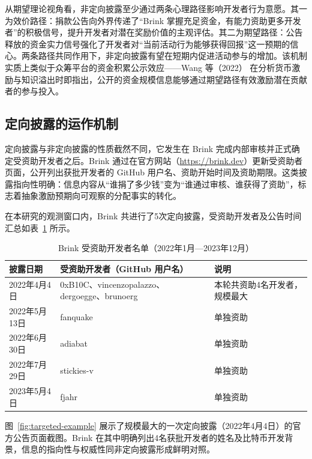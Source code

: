 从期望理论视角看，非定向披露至少通过两条心理路径影响开发者行为意愿。其一为效价路径：捐款公告向外界传递了“Brink 掌握充足资金，有能力资助更多开发者”的积极信号，提升开发者对潜在奖励价值的主观评估。其二为期望路径：公告释放的资金实力信号强化了开发者对“当前活动行为能够获得回报”这一预期的信心。两条路径共同作用下，非定向披露有望在短期内促进活动参与的增加。该机制实质上类似于众筹平台的资金积累公示效应——Wang 等（2022）\cite{wang2022monetary} 在分析货币激励与知识溢出时即指出，公开的资金规模信息能够通过期望路径有效激励潜在贡献者的参与投入。

\subsection{定向披露的运作机制}

定向披露与非定向披露的性质截然不同，它发生在 Brink 完成内部审核并正式确定受资助开发者之后。Brink 通过在官方网站（\url{https://brink.dev}）更新受资助者页面，公开列出获批开发者的 GitHub 用户名、资助开始时间及资助期限。这类披露指向性明确：信息内容从“谁捐了多少钱”变为“谁通过审核、谁获得了资助”，标志着抽象激励预期向可观察的分配事实的转化。

在本研究的观测窗口内，Brink 共进行了5次定向披露，受资助开发者及公告时间汇总如表~\ref{tab:grantees} 所示。

\begin{table}[htbp]
    \centering
    \caption{Brink 受资助开发者名单（2022年1月—2023年12月）}
    \label{tab:grantees}
    \begin{tabularx}{\textwidth}{p{2.8cm}Xp{4.5cm}}
        \toprule
        披露日期 & 受资助开发者（GitHub 用户名） & 说明 \\
        \midrule
        2022年4月4日  & 0xB10C、vincenzopalazzo、dergoegge、brunoerg & 本轮共资助4名开发者，规模最大 \\
        2022年5月13日 & fanquake & 单独资助 \\
        2022年6月30日 & adiabat   & 单独资助 \\
        2022年7月29日 & stickies-v & 单独资助 \\
        2023年5月4日  & fjahr      & 单独资助 \\
        \bottomrule
    \end{tabularx}
\end{table}

图~\ref{fig:targeted-example} 展示了规模最大的一次定向披露（2022年4月4日）的官方公告页面截图。Brink 在其中明确列出4名获批开发者的姓名及比特币开发背景，信息的指向性与权威性同非定向披露形成鲜明对照。


